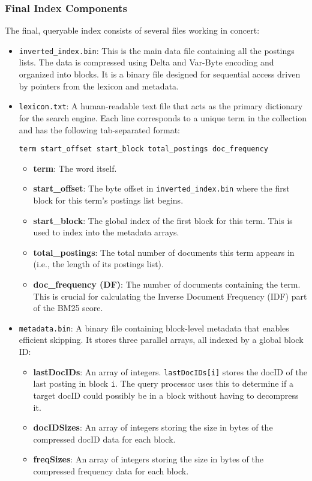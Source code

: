 \documentclass{article}
\begin{document}
\subsubsection{Final Index Components}
The final, queryable index consists of several files working in concert:
\begin{itemize}
    \item \texttt{inverted\_index.bin}: This is the main data file containing all the postings lists. The data is compressed using Delta and Var-Byte encoding and organized into blocks. It is a binary file designed for sequential access driven by pointers from the lexicon and metadata.

    \item \texttt{lexicon.txt}: A human-readable text file that acts as the primary dictionary for the search engine. Each line corresponds to a unique term in the collection and has the following tab-separated format:
    
    \texttt{term  start\_offset  start\_block  total\_postings  doc\_frequency}
    
    \begin{itemize}
        \item \textbf{term}: The word itself.
        \item \textbf{start\_offset}: The byte offset in \texttt{inverted\_index.bin} where the first block for this term's postings list begins.
        \item \textbf{start\_block}: The global index of the first block for this term. This is used to index into the metadata arrays.
        \item \textbf{total\_postings}: The total number of documents this term appears in (i.e., the length of its postings list).
        \item \textbf{doc\_frequency (DF)}: The number of documents containing the term. This is crucial for calculating the Inverse Document Frequency (IDF) part of the BM25 score.
    \end{itemize}

    \item \texttt{metadata.bin}: A binary file containing block-level metadata that enables efficient skipping. It stores three parallel arrays, all indexed by a global block ID:
    \begin{itemize}
        \item \textbf{lastDocIDs}: An array of integers. \texttt{lastDocIDs[i]} stores the docID of the last posting in block \texttt{i}. The query processor uses this to determine if a target docID could possibly be in a block without having to decompress it.
        \item \textbf{docIDSizes}: An array of integers storing the size in bytes of the compressed docID data for each block.
        \item \textbf{freqSizes}: An array of integers storing the size in bytes of the compressed frequency data for each block.
    \end{itemize}


\end{itemize}
\end{document}
